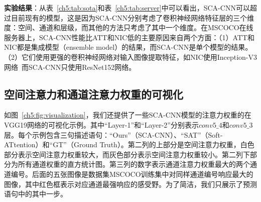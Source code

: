 \begin{table}[htbp]
\centering
{}
\caption{不同图像描述语句生成算法在数据集MSCOCO的在线服务器上的性能对比} 
\label{ch5:tab:server}
\end{table}

\textbf{实验结果}：从表~\ref{ch5:tab:sota}和表~\ref{ch5:tab:server}中可以看出，SCA-CNN可以超过目前现有的模型，这是因为SCA-CNN分别考虑了卷积神经网络特征层的三个维度：空间、通道和层级，而其他的方法只考虑了其中一个维度。在MSCOCO在线服务器上，SCA-CNN性能比ATT和NIC低的主要原因来自两个方面：（1）ATT和NIC都是集成模型（ensemble model）的结果，而SCA-CNN是单个模型的结果。（2）它们使用更强的卷积神经网络对输入图像提取特征，如NIC使用Inception-V3网络~\cite{szegedy2016rethinking}而SCA-CNN只使用ResNet152网络。


\subsection{空间注意力和通道注意力权重的可视化}
如图~\ref{ch5:fig:visualization}，我们还提供了一些SCA-CNN模型的注意力权重的在VGG19网络的可视化示例。其中“Layer-1”和“Layer-2”分别表示$conv5\_4$和$conv5\_3$层。每个示例包含三句描述语句：“Ours”（SCA-CNN）、“SAT”（Soft-ATtention）和“GT”（Ground Truth）。第二列的上部分是空间注意力权重，白色部分表示空间注意力权重较大，而灰色部分表示空间注意力权重较小。第二列下部分为所有通道权重的直方统计图。第三列的数字表示通道注意力权重最大的两个通道编号。后面的五张图像是数据集MSCOCO训练集中对同样通道编号响应最大的图像，其中红色框表示对应通道最强响应的感受野。为了简洁，我们只展示了预测语句中的其中一步。



